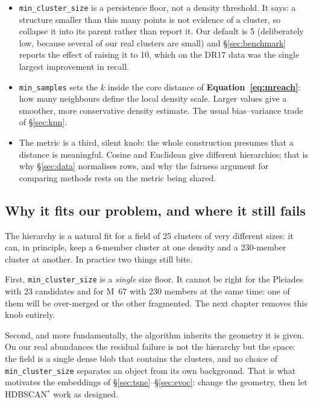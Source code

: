 \begin{itemize}
\item \texttt{min\_cluster\_size} is a persistence floor, not a density
threshold. It says: a structure smaller than this many points is not evidence
of a cluster, so collapse it into its parent rather than report it. Our default
is 5 (deliberately low, because several of our real clusters are small) and
\S\ref{sec:benchmark} reports the effect of raising it to 10, which on the DR17
data was the single largest improvement in recall.
\item \texttt{min\_samples} sets the $k$ inside the core distance of
\textbf{Equation~\ref{eq:mreach}}: how many neighbours define the local density
scale. Larger values give a smoother, more conservative density estimate. The
usual bias--variance trade of \S\ref{sec:knn}.
\item The metric is a third, silent knob: the whole construction presumes that
  a distance is meaningful. Cosine and Euclidean give different hierarchies;
  that is why \S\ref{sec:data} normalises rows, and why the fairness argument
  for comparing methods rests on the metric being shared.
\end{itemize}

\subsection{Why it fits our problem, and where it still fails}

The hierarchy is a natural fit for a field of 25 clusters of very different
sizes: it can, in principle, keep a 6-member cluster at one density and a
230-member cluster at another. In practice two things still bite.

First, \texttt{min\_cluster\_size} is a \emph{single} size floor. It cannot be
right for the Pleiades with 23 candidates and for M~67 with 230 members at the
same time: one of them will be over-merged or the other fragmented. The next
chapter removes this knob entirely.

Second, and more fundamentally, the algorithm inherits the geometry it is
given. On our real abundances the residual failure is not the hierarchy but
the space: the field is a single dense blob that contains the clusters, and no
choice of \texttt{min\_cluster\_size} separates an object from its own
background. That is what motivates the embeddings of
\S\ref{sec:tsne}--\S\ref{sec:evoc}: change the geometry, then let HDBSCAN$^*$
work as designed.

